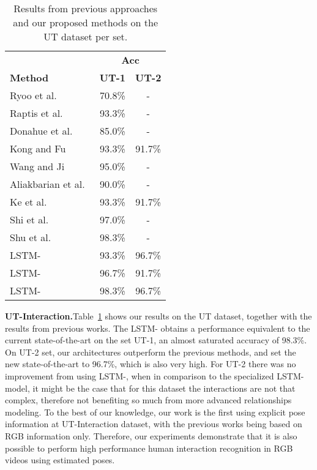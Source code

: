 \documentclass[journal,twoside]{IEEEtran}
\renewcommand{\arraystretch}{1.2}
\begin{document}
\begin{table}[ht]
	\begin{center}
	\setlength{\tabcolsep}{1em}
	\renewcommand{\arraystretch}{1.4} \caption{Results from previous approaches and our proposed methods on the UT dataset per set.}
	\begin{tabular}{lcc} 		\toprule
		& \multicolumn{2}{c}{\textbf{Acc}} \\
		\textbf{Method} & \textbf{UT-1} & \textbf{UT-2} \\ \midrule
		Ryoo et al.~\cite{Ryoo2009}								& 70.8\% & -		 \\
		Raptis et al.~\cite{Rapitis2013}					& 93.3\% & -		 \\
		Donahue et al.~\cite{Donahue2015}					& 85.0\% & -			\\
		Kong and Fu~\cite{Kong2016}								& 93.3\% & 91.7\% \\
		Wang and Ji~\cite{Wang2017}								& 95.0\% & -			\\
		Aliakbarian et al.~\cite{Aliakbarian2017}	& 90.0\% & -			\\
		Ke et al.~\cite{Ke2018}										& 93.3\% & 91.7\% \\ 
		Shi et al.~\cite{Shi2018}									& 97.0\% & -			\\ 
		Shu et al.~\cite{Shu2018}									& 98.3\% & -			\\
		\midrule
		LSTM-          					& 93.3\% & 96.7\% \\ 
		LSTM-          					& 96.7\% & 91.7\% \\ 
		LSTM- 					& 98.3\% & 96.7\% \\ 
		\bottomrule
	\end{tabular}
	\label{tab:ut_sota}
	\end{center}
\end{table}

\textbf{UT-Interaction.}\quad Table~\ref{tab:ut_sota} shows our results on the UT dataset, together with the results from previous works. 
The LSTM- obtains a performance equivalent to the current state-of-the-art on the set UT-1, an almost saturated accuracy of 98.3\%.
On UT-2 set, our architectures outperform the previous methods, and set the new state-of-the-art to 96.7\%, which is also very high. For UT-2 there was no improvement from using LSTM-, when in comparison to the specialized LSTM- model, it might be the case that for this dataset the interactions are not that complex, therefore not benefiting so much from more advanced relationships modeling.
To the best of our knowledge, our work is the first using explicit pose information at UT-Interaction dataset, with the previous works being based on RGB information only.
Therefore, our experiments demonstrate that it is also possible to perform high performance human interaction recognition in RGB videos using estimated poses.
\end{document}

